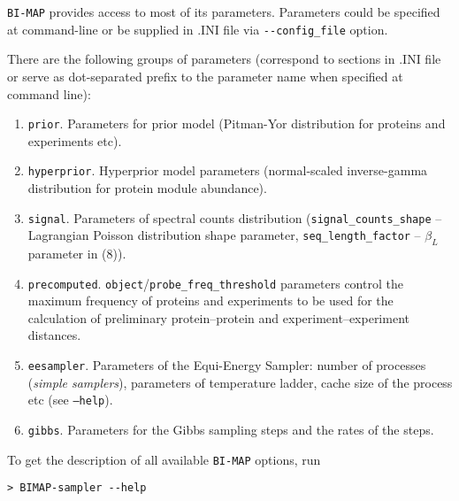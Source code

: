 \documentclass[microtype,a4paper,article,10pt,oneside,final]{memoir}
\newcommand{\bimap}{\texttt{BI-MAP}\xspace}
\begin{document}
\bimap provides access to most of its parameters.
Parameters could be specified at command-line
or be supplied in .INI file via \verb|--config_file| option.

There are the following groups of parameters
(correspond to sections in .INI file or serve as dot-separated prefix
to the parameter name when specified at command line):
\begin{enumerate}
  \item \texttt{prior}. Parameters for prior model (Pitman-Yor distribution for proteins and experiments etc).
  \item \texttt{hyperprior}. Hyperprior model parameters (normal-scaled inverse-gamma distribution for protein module abundance).
  \item \texttt{signal}. Parameters of spectral counts distribution (\texttt{signal\_counts\_shape} -- Lagrangian Poisson distribution shape parameter,
\texttt{seq\_length\_factor} -- $\beta_L$ parameter in (8)).
  \item \texttt{precomputed}. \texttt{object}/\texttt{probe\_freq\_threshold} parameters control
the maximum frequency of proteins and experiments to be used for the calculation of
preliminary protein--protein and experiment--experiment distances.
  \item \texttt{eesampler}. Parameters of the Equi-Energy Sampler: number of processes (\emph{simple samplers}),
parameters of temperature ladder, cache size of the process etc (see \texttt{--help}).
  \item \texttt{gibbs}. Parameters for the Gibbs sampling steps and the rates of the steps.
\end{enumerate}

To get the description of all available \bimap options, run
\begin{verbatim}
> BIMAP-sampler --help
\end{verbatim}
\end{document}
